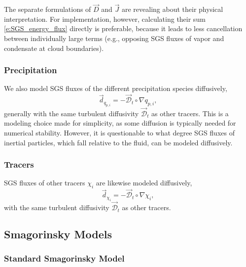 \documentclass{report}
\begin{document}
The separate formulations of $\vec{D}$ and $\vec{J}$ are revealing about their physical interpretation. For implementation, however, calculating their sum \eqref{e:SGS_energy_flux} directly is preferable, because it leads to less cancellation between individually large terms (e.g., opposing SGS fluxes of vapor and condensate at cloud boundaries).

\subsubsection{Precipitation}

We also model SGS fluxes of the different precipitation species diffusively,
\begin{equation}\label{eq:sgs-precip-flux}
\vec{d}_{q_{p, i}} = - \vec{\mathcal{D}}_t \circ \nabla q_{p, i},
\end{equation}
generally with the same turbulent diffusivity $\vec{\mathcal{D}}_t$ as other tracers. This is a modeling choice made for simplicity, as some diffusion is typically needed for numerical stability. However, it is questionable to what degree SGS fluxes of inertial particles, which fall relative to the fluid, can be modeled diffusively.

\subsubsection{Tracers}

SGS fluxes of other tracers $\chi_i$ are likewise modeled diffusively,
\begin{equation}\label{eq:sgs-tracer-flux}
\vec{d}_{\chi_i} = - \vec{\mathcal{D}}_t \circ \nabla \chi_i,
\end{equation}
with the same turbulent diffusivity $\vec{\mathcal{D}}_t$ as other tracers.

\subsection{Smagorinsky Models}

\subsubsection{Standard Smagorinsky Model}
\end{document}
